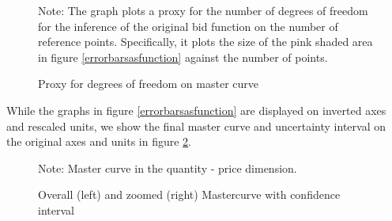 \begin{figure}[!ht]
\begin{center}
\caption{Proxy for degrees of freedom on master curve}
\label{decreasingdegreesoff}
\end{center}
{ \small Note: The graph plots a proxy for the number of degrees of freedom for the inference of the original bid function on the number of reference points. Specifically, it plots the size of the pink shaded area in figure \ref{errorbarsasfunction} against the number of points. } 
\end{figure}

While the graphs in figure \ref{errorbarsasfunction} are displayed on inverted axes and rescaled units, we show the final master curve and uncertainty interval on the original axes and units in figure \ref{notrescaledmastercurves}. 

\begin{figure}[!ht]
\begin{center}
\caption{Overall (left) and zoomed (right) Mastercurve with confidence interval}
\label{notrescaledmastercurves}
\end{center}
{ \small Note: Master curve in the quantity - price dimension.  } 
\end{figure}


